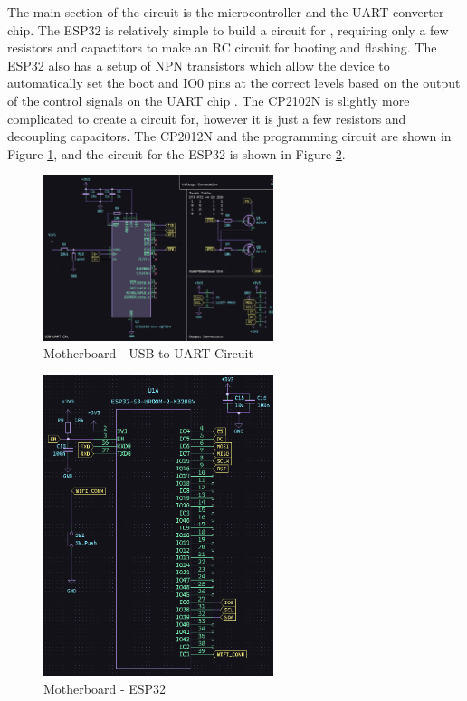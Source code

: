 \documentclass[12pt]{article}
\begin{document}
    The main section of the circuit is the microcontroller and the UART converter chip. The ESP32 is relatively simple to build a circuit for \cite{esp32}, requiring only a few resistors and capactitors to make an RC circuit for booting and flashing. The ESP32 also has a setup of NPN transistors which allow the device to automatically set the boot and IO0 pins at the correct levels based on the output of the control signals on the UART chip \cite{esp32, UART}. The CP2102N is slightly more complicated to create a circuit for, however it is just a few resistors and decoupling capacitors. The CP2012N and the programming circuit are shown in Figure \ref{pcb_uart}, and the circuit for the ESP32 is shown in Figure \ref{pcb_esp32}.

    \begin{figure}[ht]
        \centering
        \includegraphics[width=0.6\textwidth]{images/pcb_uart.png}
        \caption{Motherboard - USB to UART Circuit}
        \label{pcb_uart}
    \end{figure}

    \begin{figure}[ht]
        \centering
        \includegraphics[width=0.6\textwidth]{images/pcb_esp32.png}
        \caption{Motherboard - ESP32}
        \label{pcb_esp32}
    \end{figure}
\end{document}
